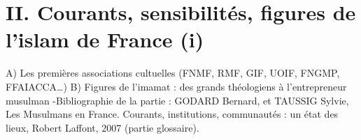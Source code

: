 
\chapter{II. Courants, sensibilités, figures de l’islam de France (i)
}


A) Les premières associations cultuelles (FNMF, RMF, GIF, UOIF, FNGMP,
FFAIACCA…)
B) Figures de l’imamat : des grands théologiens à l’entrepreneur musulman
-Bibliographie de la partie :
GODARD Bernard, et TAUSSIG Sylvie, Les Musulmans en France. Courants,
institutions, communautés : un état des lieux, Robert Laffont, 2007 (partie glossaire).